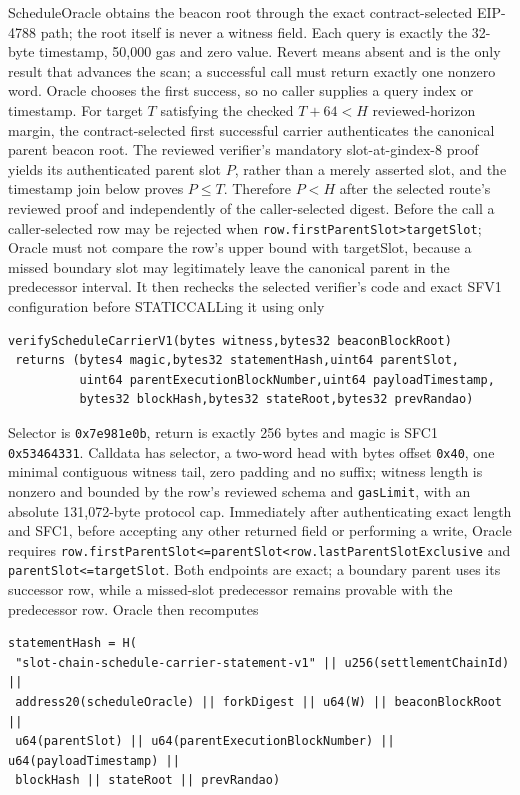 \documentclass[a4paper,11pt]{article}
\newcommand{\code}[1]{\nolinkurl{#1}}
\begin{document}
ScheduleOracle obtains the beacon root through the exact contract-selected
EIP-4788 path; the root itself is never a witness field.  Each query is exactly
the 32-byte timestamp, 50,000 gas and zero value.  Revert means absent and is
the only result that advances the scan; a successful call must return exactly
one nonzero word.  Oracle chooses the first success, so no caller supplies a
query index or timestamp.  For target $T$ satisfying the checked
$T+64<H$ reviewed-horizon margin, the
contract-selected first successful carrier authenticates the canonical parent
beacon root.  The reviewed verifier's mandatory slot-at-gindex-8 proof yields
its authenticated parent slot $P$, rather than a merely asserted slot, and the
timestamp join below proves $P\le T$.  Therefore $P<H$ after the selected
route's reviewed proof and independently of the caller-selected digest.  Before
the call a caller-selected row may be rejected when
\code{row.firstParentSlot>targetSlot}; Oracle must not compare the row's upper
bound with targetSlot, because a missed boundary slot may legitimately leave
the canonical parent in the predecessor interval.  It then rechecks the
selected verifier's
code and exact SFV1 configuration before STATICCALLing it using only
\begin{verbatim}
verifyScheduleCarrierV1(bytes witness,bytes32 beaconBlockRoot)
 returns (bytes4 magic,bytes32 statementHash,uint64 parentSlot,
          uint64 parentExecutionBlockNumber,uint64 payloadTimestamp,
          bytes32 blockHash,bytes32 stateRoot,bytes32 prevRandao)
\end{verbatim}
Selector is \code{0x7e981e0b}, return is exactly 256 bytes and magic is SFC1
\code{0x53464331}.  Calldata has selector, a two-word head with bytes offset
\code{0x40}, one minimal contiguous witness tail, zero padding and no suffix;
witness length is nonzero and bounded by the row's reviewed schema and
\code{gasLimit}, with an absolute 131,072-byte protocol cap.  Immediately
after authenticating exact length and SFC1, before accepting any
other returned field or performing a write, Oracle requires
\code{row.firstParentSlot<=parentSlot<row.lastParentSlotExclusive} and
\code{parentSlot<=targetSlot}.  Both endpoints are exact; a boundary parent
uses its successor row, while a missed-slot predecessor remains provable with
the predecessor row.  Oracle then recomputes
\begin{verbatim}
statementHash = H(
 "slot-chain-schedule-carrier-statement-v1" || u256(settlementChainId) ||
 address20(scheduleOracle) || forkDigest || u64(W) || beaconBlockRoot ||
 u64(parentSlot) || u64(parentExecutionBlockNumber) || u64(payloadTimestamp) ||
 blockHash || stateRoot || prevRandao)
\end{verbatim}
\end{document}
